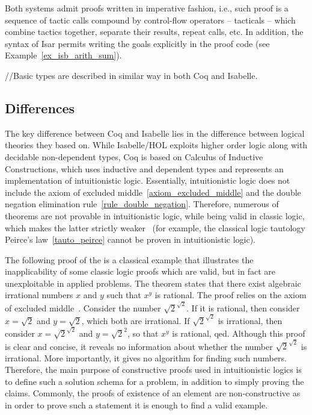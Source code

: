 \documentclass[article]{aaltoseries}
\begin{document}
Both systems admit proofs written in imperative fashion, i.e., such proof is a sequence of tactic calls compound by control-flow operators -- tacticals -- which combine tactics together, separate their results, repeat calls, etc. In addition, the syntax of Isar permits writing the goals explicitly in the proof code (see Example~\ref{ex_isb_arith_sum}).

//Basic types are described in similar way in both Coq and Isabelle. 


\subsection{Differences}

The key difference between Coq and Isabelle lies in the difference between logical theories they based on. While Isabelle/HOL exploits higher order logic along with decidable non-dependent types, Coq is based on Calculus of Inductive Constructions, which uses inductive and dependent types and represents an implementation of intuitionistic logic. Essentially, intuitionistic logic does not include the axiom of excluded middle~\eqref{axiom_excluded_middle} and the double negation elimination rule~\eqref{rule_double_negation}.
Therefore, numerous of theorems are not provable in intuitionistic logic, while being valid in classic logic, which makes the latter strictly weaker~\cite{Rush14} (for example, the classical logic tautology Peirce's law~\eqref{tauto_peirce} cannot be proven in intuitionistic logic).

The following proof of the is a classical example that illustrates the inapplicability of some classic logic proofs which are valid, but in fact are unexploitable in applied problems. The theorem states that there exist algebraic irrational numbers $x$ and $y$ such that $x^y$ is rational. The proof relies on the axiom of excluded middle~\cite{Harrison09}. Consider the number $\sqrt{2}^{\sqrt{2}}$. If it is rational, then consider $x = \sqrt{2}$ and $y = \sqrt{2}$, which both are irrational. If $\sqrt{2}^{\sqrt{2}}$ is irrational, then consider $x = \sqrt{2}^{\sqrt{2}}$ and $y = \sqrt{2}^{2}$, so that $x^{y}$ is rational, qed. Although this proof is clear and concise, it reveals no information about whether the number $\sqrt{2}^{\sqrt{2}}$ is irrational. More importantly, it gives no algorithm for finding such numbers. Therefore, the main purpose of constructive proofs used in intuitionistic logics is to define such a solution schema for a problem, in addition to simply proving the claims.
Commonly, the proofs of existence of an element are non-constructive as in order to prove such a statement it is enough to find a valid example. %
\end{document}
